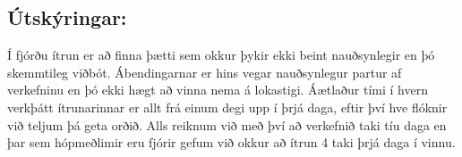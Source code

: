 \documentclass[a4,12pt]{article}
\begin{document}
\subsection{Útskýringar:} Í fjórðu ítrun er að finna þætti sem okkur þykir ekki beint nauðsynlegir en þó skemmtileg viðbót. Ábendingarnar er hins vegar nauðsynlegur partur af verkefninu en þó ekki hægt að vinna nema á lokastigi. Áætlaður tími í hvern verkþátt ítrunarinnar er allt frá einum degi upp í þrjá daga, eftir því hve flóknir við teljum þá geta orðið. Alls reiknum við með því að verkefnið taki tíu daga en þar sem hópmeðlimir eru fjórir gefum við okkur að ítrun 4 taki þrjá daga í vinnu.
\end{document}
